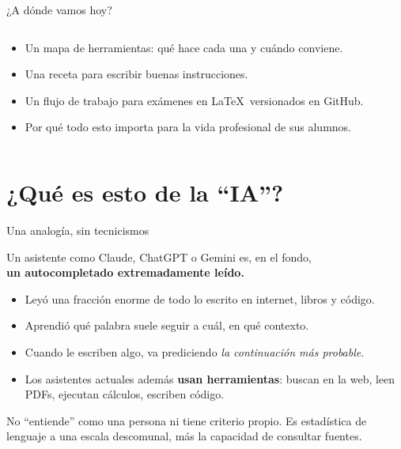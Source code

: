 \documentclass[aspectratio=169,10pt]{beamer}
\begin{document}
\begin{frame}{¿A dónde vamos hoy?}
\begin{columns}[T]
\tableofcontents
{}
\begin{tipbox}
\small
\begin{itemize}
  \item Un mapa de herramientas: qué hace cada una y cuándo conviene.
  \item Una receta para escribir buenas instrucciones.
  \item Un flujo de trabajo para exámenes en \LaTeX\ versionados en GitHub.
  \item Por qué todo esto importa para la vida profesional de sus alumnos.
\end{itemize}
\end{tipbox}
\end{columns}
\end{frame}


\section{¿Qué es esto de la ``IA''?}

\begin{frame}{Una analogía, sin tecnicismos}
\begin{center}
\Large\color{Dp}\faComments
\end{center}
\vspace{6pt}
\begin{center}
\parbox{0.85\textwidth}{\centering\large
Un asistente como Claude, ChatGPT o Gemini es, en el fondo,\\[4pt]
\textbf{\color{Ac}un autocompletado extremadamente leído.}}
\end{center}
\vspace{10pt}
\begin{itemize}
  \item Leyó una fracción enorme de todo lo escrito en internet, libros y código.
  \item Aprendió qué palabra suele seguir a cuál, en qué contexto.
  \item Cuando le escriben algo, va prediciendo \emph{la continuación más probable}.
  \item Los asistentes actuales además \textbf{usan herramientas}: buscan en la web, leen PDFs, ejecutan cálculos, escriben código.
\end{itemize}
\vspace{6pt}
\begin{tipbox}
No ``entiende'' como una persona ni tiene criterio propio. Es estadística de lenguaje a una escala descomunal, más la capacidad de consultar fuentes.
\end{tipbox}
\end{frame}
\end{document}

